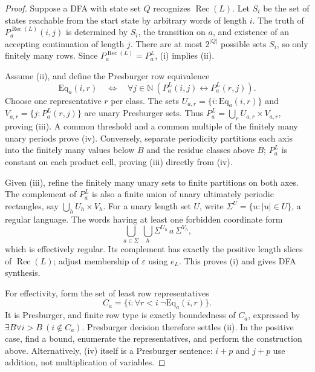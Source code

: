 \documentclass[11pt,letterpaper]{article}
\theoremstyle{definition}
\theoremstyle{remark}
\newcommand{\N}{\mathbb N}
\newcommand{\eps}{\varepsilon}
\newcommand{\rec}{\operatorname{Rec}}
\begin{document}
\begin{proof}
Suppose a DFA with state set $Q$ recognizes $\rec(L)$. Let $S_i$ be the set
of states reachable from the start state by arbitrary words of length $i$.
The truth of $P_a^{\rec(L)}(i,j)$ is determined by $S_i$, the transition on
$a$, and existence of an accepting continuation of length $j$. There are
at most $2^{|Q|}$ possible sets $S_i$, so only finitely many rows. Since
$P_a^{\rec(L)}=P_a^L$, (i) implies (ii).

Assume (ii), and define the Presburger row equivalence
\begin{equation}\label{ccc:cl:eq:rowequiv}
 \mathrm{Eq}_a(i,r)\quad\Longleftrightarrow\quad
 \forall j\in\N\ (P_a^L(i,j)\leftrightarrow P_a^L(r,j)).
\end{equation}
Choose one representative $r$ per class. The sets
$U_{a,r}=\{i:\mathrm{Eq}_a(i,r)\}$ and $V_{a,r}=\{j:P_a^L(r,j)\}$ are unary
Presburger sets. Thus
$P_a^L=\bigcup_r U_{a,r}\times V_{a,r}$, proving (iii).
A common threshold and a common multiple of the finitely many unary
periods prove (iv). Conversely, separate periodicity partitions each axis
into the finitely many values below $B$ and the residue classes above $B$;
$P_a^L$ is constant on each product cell, proving (iii) directly from (iv).

Given (iii), refine the finitely many unary sets to finite partitions on
both axes. The complement of $P_a^L$ is also a finite union of unary
ultimately periodic rectangles, say $\bigcup_h U_h\times V_h$.
For a unary length set $U$, write $\Sigma^U=\{u:|u|\in U\}$, a regular
language. The words having at least one forbidden coordinate form
\[
 \bigcup_{a\in\Sigma}\ \bigcup_{h}\Sigma^{U_h}\,a\,\Sigma^{V_h},
\]
which is effectively regular. Its complement has exactly the positive
length slices of $\rec(L)$; adjust membership of $\eps$ using $e_L$.
This proves (i) and gives DFA synthesis.

For effectivity, form the set of least row representatives
\begin{equation}\label{ccc:cl:eq:canonicalrows}
 C_a=\{i:\forall r<i\ \neg \mathrm{Eq}_a(i,r)\}.
\end{equation}
It is Presburger, and finite row type is exactly boundedness of $C_a$,
expressed by $\exists B\forall i>B\ (i\notin C_a)$. Presburger decision
therefore settles (ii). In the positive case, find a bound, enumerate the
representatives, and perform the construction above. Alternatively,
(iv) itself is a Presburger sentence: $i+p$ and $j+p$ use addition, not
multiplication of variables.
\end{proof}
\end{document}
